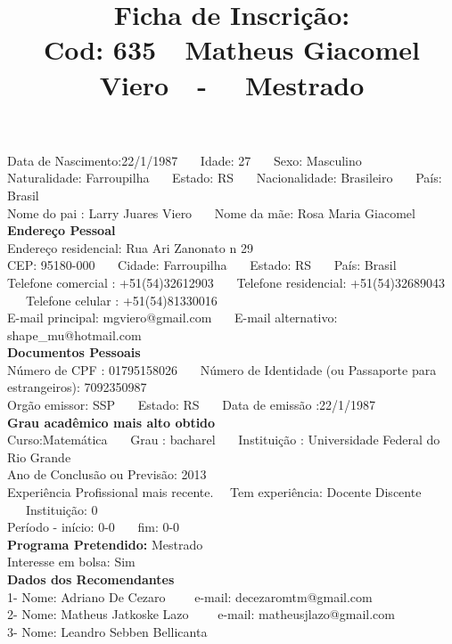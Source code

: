 \documentclass[11pt]{article}
\title{\vspace*{-4cm} Ficha de Inscrição: \\Cod: 635\ \ Matheus Giacomel Viero\ \ - \ \ Mestrado 
 }
\date{}
\begin{document}
\maketitle
\vspace*{-1.5cm}
\noindent Data de Nascimento:22/1/1987
\ \ \ Idade: 27   \ \ \ Sexo: Masculino
\\
Naturalidade: Farroupilha  
\ \ \  Estado: RS
\ \ \  Nacionalidade: Brasileiro
\ \ \ País: Brasil
\\        
Nome do pai : Larry Juares Viero
\ \ \ Nome da mãe: Rosa Maria Giacomel          
\\[0.2cm]                     
\textbf{Endereço Pessoal} 
\\ 
\noindent Endereço residencial: Rua Ari Zanonato n 29
\\
        CEP: 95180-000 
\ \ \ Cidade: Farroupilha 
\ \ \ Estado: RS 
\ \ \ País: Brasil
\\		
		Telefone comercial : +51(54)32612903
\ \ \ Telefone residencial: +51(54)32689043
\ \ \ Telefone celular : +51(54)81330016
\\
E-mail principal: mgviero@gmail.com
\ \ \ E-mail alternativo: shape\_mu@hotmail.com 
\\[0.2cm] 
\textbf{Documentos Pessoais}
\\
\noindent Número de CPF : 01795158026
\ \ \ Número de Identidade (ou Passaporte para estrangeiros): 7092350987
\\
Orgão emissor: SSP
\ \ \ Estado: RS
\ \ \ Data de emissão :22/1/1987
\\[0.3cm]
\textbf{Grau acadêmico mais alto obtido}
\\	
Curso:Matemática
\ \ \ Grau : bacharel
\ \ \ Instituição : Universidade Federal do Rio Grande
\\			
Ano de Conclusão ou Previsão: 2013
\\ 
Experiência Profissional mais recente. \ \  
Tem experiência: Docente Discente  
\ \ \ Instituição: 0
\\  
Período - início: 0-0
\ \ \ fim: 0-0
\\[0.2cm] 
\textbf{Programa Pretendido:} Mestrado\\
Interesse em bolsa: Sim
\\[0.3cm]		
\textbf{Dados dos Recomendantes} 
\\
1- Nome: Adriano De Cezaro
\ \ \ \  e-mail: decezaromtm@gmail.com 
\\
2- Nome: Matheus Jatkoske Lazo
\ \ \ \ e-mail: matheusjlazo@gmail.com
\\
3- Nome: Leandro Sebben Bellicanta
\end{document}
